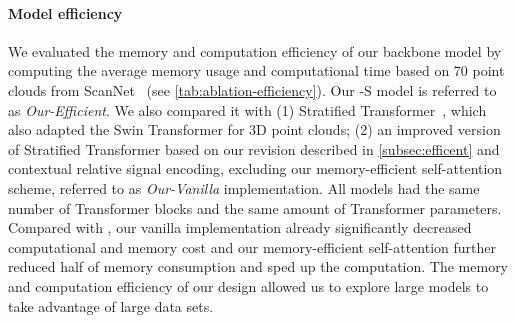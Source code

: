 \documentclass[10pt,twocolumn,letterpaper]{article}
\begin{document}
\paragraph{Model efficiency}
We evaluated the memory and computation efficiency of our backbone model by computing the average memory usage and computational time based on 70 point clouds from ScanNet~\cite{dai2017scannet} (see \cref{tab:ablation-efficiency}). Our {\SST}-S model is referred to as \emph{Our-Efficient}. We also compared it with (1) Stratified Transformer~\cite{lai2022stratified}, which also adapted the Swin Transformer for 3D point clouds; (2) an improved version of Stratified Transformer based on our revision described in \cref{subsec:efficent} and contextual relative signal encoding, excluding our memory-efficient self-attention scheme, referred to as \emph{Our-Vanilla} implementation. All models had the same number of Transformer blocks and the same amount of Transformer parameters. Compared with \cite{lai2022stratified}, our vanilla implementation already significantly decreased computational and memory cost and our memory-efficient self-attention further reduced half of memory consumption and sped up the computation. The memory and computation efficiency of our design allowed us to explore large {\SST} models to take advantage of large data sets.
\end{document}
